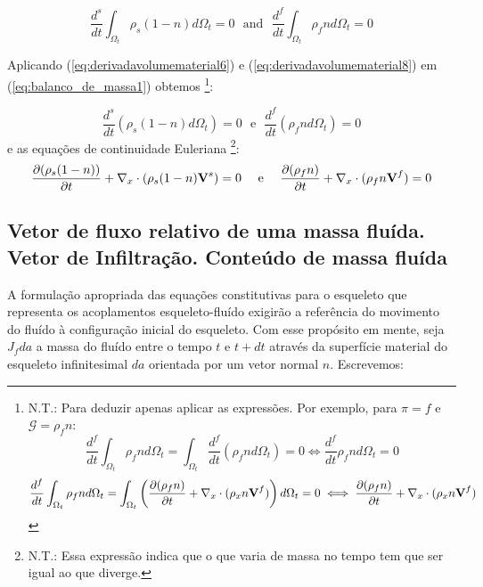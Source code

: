 \documentclass[
	11pt, %
	fleqn, %
	a4paper, %
]{LegrandOrangeBook}
\begin{document}
\begin{equation}
	\label{eq:balanco_de_massa1}	
	\dfrac{d^s}{dt}\int_{\Omega_t}\rho_s(1-n)d\Omega_t = 0~~~ \text{and}~~~\dfrac{d^f}{dt}\int_{\Omega_t}\rho_fnd\Omega_t = 0 
\end{equation}

Aplicando (\ref{eq:derivadavolumematerial6}) e (\ref{eq:derivadavolumematerial8}) em (\ref{eq:balanco_de_massa1}) obtemos \footnote{N.T.: Para deduzir apenas aplicar as expressões. Por exemplo, para $\pi=f$ e $\mathcal{G} = \rho_fn$:
\begin{displaymath}	
	\dfrac{d^f}{dt}\int_{\Omega_t}^{}\rho_fnd\Omega_t=\int_{\Omega_t}^{}\dfrac{d^f}{dt}(\rho_fnd\Omega_t)=0 \iff \dfrac{d^f}{dt}\rho_fnd\Omega_t = 0
\end{displaymath}
\begin{displaymath}	
	\dfrac{d^f}{dt}\int_{\Omega_t}^{}\rho_fnd\Omega_t=\int_{\Omega_t}^{}\left(\dfrac{\partial (\rho_f n)}{\partial t}+\nabla_x \cdot(\rho_xn\textbf{V}^f) \right)d\Omega_t=0 \iff \dfrac{\partial (\rho_f n)}{\partial t}+\nabla_x \cdot(\rho_xn\textbf{V}^f)
\end{displaymath}
}:

\begin{equation}
	\label{eq:balanco_de_massa2}	
	\dfrac{d^s}{dt}(\rho_s(1-n)d\Omega_t) = 0~~~ \text{e}~~~\dfrac{d^f}{dt}(\rho_fnd\Omega_t) = 0 
\end{equation}
e as equações de continuidade Euleriana \footnote{N.T.: Essa expressão indica que o que varia de massa no tempo tem que ser igual ao que diverge.}:
\begin{equation}
	\label{eq:balanco_de_massa3}	
	\dfrac{\partial(\rho_s(1-n))}{\partial t} + \nabla_x \cdot (\rho_s(1-n)\textbf{V}^s)=0 ~~~~ \text{e} ~~~~ \dfrac{\partial(\rho_fn)}{\partial t} + \nabla_x \cdot (\rho_fn\textbf{V}^f)=0
\end{equation}

\subsection{Vetor de fluxo relativo de uma massa fluída. Vetor de Infiltração. Conteúdo de massa fluída}

A formulação apropriada das equações constitutivas para o esqueleto que representa os acoplamentos esqueleto-fluído exigirão a referência do movimento do fluído à configuração inicial do esqueleto. Com esse propósito em mente, seja $J_fda$ a massa do fluído entre o tempo $t$ e $t+dt$ através da superfície material do esqueleto infinitesimal $da$ orientada por um vetor normal $n$. Escrevemos: 
\end{document}
